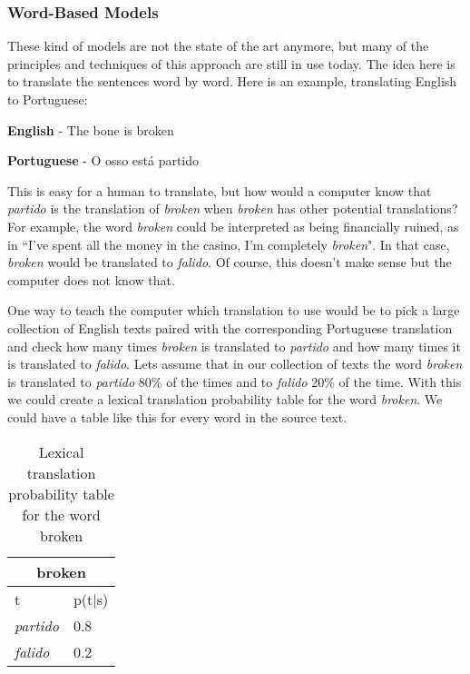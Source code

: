 \subsubsection{Word-Based Models}

These kind of models are not the state of the art anymore, but many of the principles and techniques of this approach are still in use today. The idea here is to translate the sentences word by word. Here is an example, translating English to Portuguese:

\begin{center}
\textbf{English}    - The bone    is      broken

\textbf{Portuguese} -  O  osso   está     partido
\end{center}

This is easy for a human to translate, but how would a computer know that \textit{partido} is the translation of \textit{broken} when \textit{broken} has other potential translations? For example, the word \textit{broken} could be interpreted as being financially ruined, as in “I’ve spent all the money in the casino, I'm completely \textit{broken}". In that case, \textit{broken} would be translated to \textit{falido}. Of course, this doesn't make sense but the computer does not know that.

One way to teach the computer which translation to use would be to pick a large collection of English texts paired with the corresponding Portuguese translation and check how many times \textit{broken} is translated to \textit{partido} and how many times it is translated to \textit{falido}. Lets assume that in our collection of texts the word \textit{broken} is translated to \textit{partido} 80\% of the times and to \textit{falido} 20\% of the time. With this we could create a lexical translation probability table for the word \textit{broken}. We could have a table like this for every word in the source text.

\begin{table}[ht]
\centering
\begin{tabular}{ll}
\multicolumn{2}{c}{\textbf{broken}} \\ \hline
t                     & p(t|s)      \\ \hline
\textit{partido}      & 0.8         \\
\textit{falido}       & 0.2         \\ \hline
\end{tabular}
\caption{Lexical translation probability table for the word broken}
\label{table:translation-prob-table}
\end{table}

